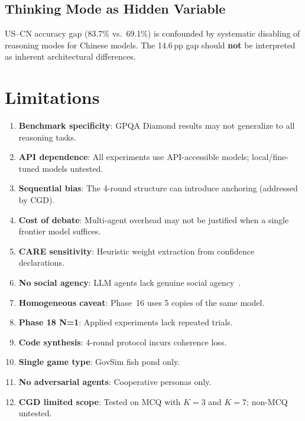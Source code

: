 \documentclass[11pt,a4paper]{article}
\newcommand{\pp}{\,pp\xspace}
\begin{document}
\subsection{Thinking Mode as Hidden Variable}

US--CN accuracy gap (83.7\% vs.\ 69.1\%) is confounded by systematic
disabling of reasoning modes for Chinese models.  The 14.6\pp gap
should \textbf{not} be interpreted as inherent architectural
differences.

\section{Limitations}\label{sec:limitations}

\begin{enumerate}
  \item \textbf{Benchmark specificity}: GPQA Diamond results may not
    generalize to all reasoning tasks.
  \item \textbf{API dependence}: All experiments use API-accessible
    models; local/fine-tuned models untested.
  \item \textbf{Sequential bias}: The 4-round structure can introduce
    anchoring (addressed by CGD).
  \item \textbf{Cost of debate}: Multi-agent overhead may not be
    justified when a single frontier model suffices.
  \item \textbf{CARE sensitivity}: Heuristic weight extraction from
    confidence declarations.
  \item \textbf{No social agency}: LLM agents lack genuine social
    agency~\cite{lamalfa2025limits}.
  \item \textbf{Homogeneous caveat}: Phase~16 uses 5 copies of the
    same model.
  \item \textbf{Phase 18 N=1}: Applied experiments lack repeated
    trials.
  \item \textbf{Code synthesis}: 4-round protocol incurs coherence
    loss.
  \item \textbf{Single game type}: GovSim fish pond only.
  \item \textbf{No adversarial agents}: Cooperative personas only.
  \item \textbf{CGD limited scope}: Tested on MCQ with $K=3$ and
    $K=7$; non-MCQ untested.
\end{enumerate}
\end{document}
